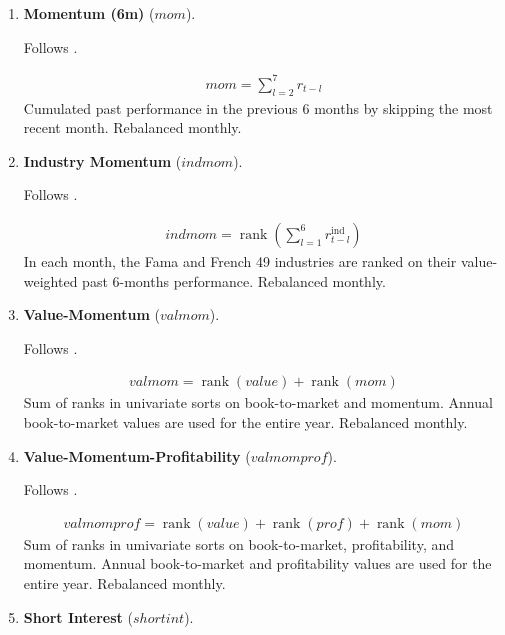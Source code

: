 \begin{enumerate}
	

	\item \textbf{Momentum (6m)} ($mom$). 
	
	Follows . 
	
	\begin{align*}
		mom = \sum_{l=2}^7 r_{t-l}
	\end{align*}
	Cumulated past performance in the previous 6 months by skipping the most recent month. Rebalanced monthly.
	
	
	
	\item \textbf{Industry Momentum} ($indmom$). 
	
	Follows . 
	
	\begin{align*}
		indmom = \operatorname{rank} \left( \sum_{l=1}^6 r_{t-l}^{\text{ind}} \right)
	\end{align*}
	In each month, the Fama and French 49 industries are ranked on their value-weighted past 6-months performance. Rebalanced monthly.
	
	
	
	\item \textbf{Value-Momentum} ($valmom$). 
	
	Follows . 
	
	\begin{align*}
		valmom =\operatorname{rank}(value) + \operatorname{rank}(mom)
	\end{align*}
	Sum of ranks in univariate sorts on book-to-market and momentum. Annual book-to-market values are used for the entire year. Rebalanced monthly.
	
	
	
	\item \textbf{Value-Momentum-Profitability} ($valmomprof$). 
	
	Follows . 
	
	\begin{align*}
		valmomprof =\operatorname{rank}(value) + \operatorname{rank}(prof) + \operatorname{rank}(mom)
	\end{align*}
	Sum of ranks in umivariate sorts on book-to-market, profitability, and momentum. Annual book-to-market and profitability values are used for the entire year. Rebalanced monthly.
	
	
	
	\item \textbf{Short Interest} ($shortint$). 
	

\end{enumerate}
